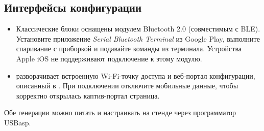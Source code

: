 \subsection{Интерфейсы конфигурации}
\begin{itemize}
    \item Классические блоки \ReplicaGenOne{} оснащены модулем Bluetooth 2.0 (совместимым с BLE). Установите приложение \emph{Serial Bluetooth Terminal} из Google Play, выполните спаривание с приборкой и подавайте команды из терминала. Устройства Apple iOS не поддерживают подключение к этому модулю.
    \item \ReplicaNextShort{} разворачивает встроенную Wi-Fi-точку доступа и веб-портал конфигурации, описанный в . При подключении отключите мобильные данные, чтобы корректно открылась каптив-портал страница.
\end{itemize}
Обе генерации можно питать и настраивать на стенде через программатор USBasp.
